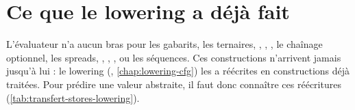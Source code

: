 \section{Ce que le lowering a déjà fait}
\label{sec:transfert-stores-lowering}

L'évaluateur n'a aucun bras pour les gabarits, les ternaires, \code{&&},
\code{||}, , le chaînage optionnel, les spreads, \code{++},
, ,  ou les séquences. Ces constructions
n'arrivent jamais jusqu'à lui : le lowering
(, \cref{chap:lowering-cfg}) les a réécrites
en constructions déjà traitées. Pour prédire une valeur abstraite, il faut
donc connaître ces réécritures (\cref{tab:transfert-stores-lowering}).

